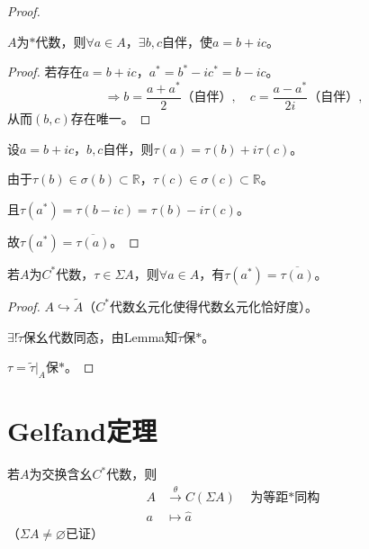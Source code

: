\documentclass[lang=cn,a4paper,newtx,section]{elegantbook}
\begin{document}
\begin{proof}
  \begin{proposition}
    $A$为$*$代数，则$\forall a \in A$，$\exists b, c$自伴，使$a = b + ic$。
  \end{proposition}
  
  \begin{proof}
    若存在$a = b + ic$，$a^* = b^* - ic^* = b - ic$。
    \begin{equation*}
      \Rightarrow b = \frac{a + a^*}{2}\text{（自伴）}, \quad c = \frac{a - a^*}{2i}\text{（自伴）},
    \end{equation*}
    从而$(b, c)$存在唯一。
  \end{proof}
  
  设$a = b + ic$，$b, c$自伴，则$\tau(a) = \tau(b) + i\tau(c)$。
  
  由于$\tau(b) \in \sigma(b) \subset \mathbb{R}$，$\tau(c) \in \sigma(c) \subset \mathbb{R}$。
  
  且$\tau(a^*) = \tau(b - ic) = \tau(b) - i\tau(c)$。
  
  故$\tau(a^*) = \overline{\tau(a)}$。
\end{proof}

\begin{lemma}
  若$A$为$C^*$代数，$\tau \in \Sigma A$，则$\forall a \in A$，有$\tau(a^*) = \overline{\tau(a)}$。
\end{lemma}

\begin{proof}
  $A \hookrightarrow \tilde{A}$（$C^*$代数幺元化使得代数幺元化恰好度）。
  
  $\exists! \tilde{\tau}$保幺代数同态，由Lemma知$\tilde{\tau}$保$*$。
  
  $\tau = \tilde{\tau}|_A$保$*$。
\end{proof}

\section{Gelfand定理}

\begin{theorem}[Gelfand]
  若$A$为交换含幺$C^*$代数，则
  \begin{equation*}
    \begin{aligned}
      A &\xrightarrow{\theta} C(\Sigma A) \quad \text{为等距$*$同构} \\
      a &\longmapsto \hat{a}
    \end{aligned}
  \end{equation*}
  （$\Sigma A \neq \varnothing$已证）
\end{theorem}
\end{document}
